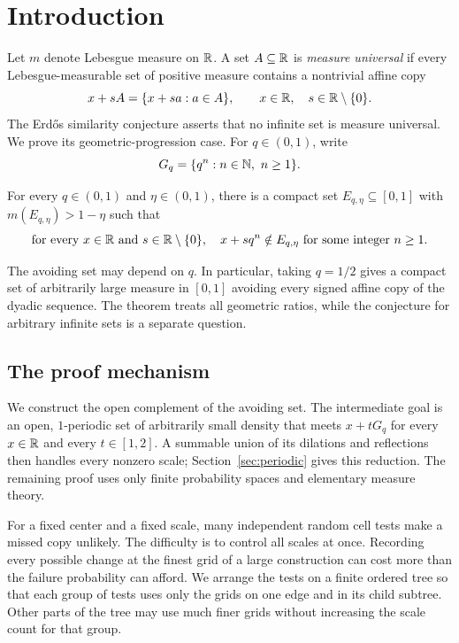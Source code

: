 \section{Introduction}\label{sec:introduction}

Let $m$ denote Lebesgue measure on $\mathbb R$. A set $A\subseteq\mathbb R$ is
\emph{measure universal} if every Lebesgue-measurable set of positive
measure contains a nontrivial affine copy
\[
 x+sA=\{x+sa:a\in A\},\qquad x\in\mathbb R,\quad s\in\mathbb R\setminus\{0\}.
\]
The Erd\H{o}s similarity conjecture \cite[Problem~4.33.7*]{Erdos1974Problems}
asserts that no infinite set is measure universal. We prove its
geometric-progression case. For
$q\in(0,1)$, write
\[
 G_q=\{q^n:n\in\N,\ n\ge1\}.
\]

\begin{theorem}\label{thm:main}
For every $q\in(0,1)$ and $\eta\in(0,1)$, there is a compact set
$E_{q,\eta}\subseteq[0,1]$ with $m(E_{q,\eta})>1-\eta$ such that
\[
 \text{for every }x\in\mathbb R\text{ and }s\in\mathbb R\setminus\{0\},
 \quad x+sq^n\notin E_{q,\eta}\text{ for some integer }n\ge1.
\]
\end{theorem}

The avoiding set may depend on $q$. In particular, taking $q=1/2$
gives a compact set of arbitrarily large measure in $[0,1]$ avoiding
every signed affine copy of the dyadic sequence. The theorem treats
all geometric ratios, while the conjecture for arbitrary infinite
sets is a separate question.



\subsection{The proof mechanism}

We construct the open complement of the avoiding set. The intermediate
goal is an open, $1$-periodic set of arbitrarily small density that meets
$x+tG_q$ for every $x\in\mathbb R$ and every $t\in[1,2]$. A summable union
of its dilations and reflections then handles every nonzero scale;
Section~\ref{sec:periodic} gives this reduction. The remaining proof
uses only finite probability spaces and elementary measure theory.

For a fixed center and a fixed scale, many independent random cell
tests make a missed copy unlikely. The difficulty is to control all
scales at once. Recording every possible change at the finest grid
of a large construction can cost more than the failure probability
can afford. We arrange the tests on a finite ordered tree so that each
group of tests uses only the grids on one edge and in its child subtree.
Other parts of the tree may use much finer grids without increasing
the scale count for that group.

